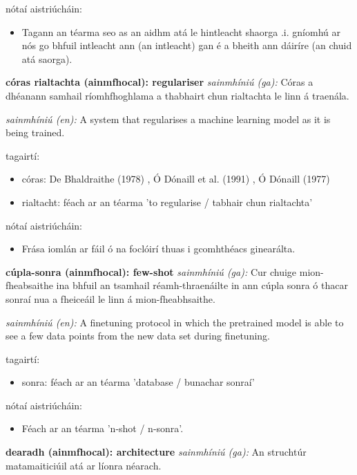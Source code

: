 \documentclass{article}
\begin{document}
nótaí aistriúcháin:
\begin{itemize}
	\item Tagann an téarma seo as an aidhm atá le hintleacht shaorga .i. gníomhú ar nós go bhfuil intleacht ann (an intleacht) gan é a bheith ann dáiríre (an chuid atá saorga).
\end{itemize}


\textbf{córas rialtachta (ainmfhocal): regulariser}
\textit{sainmhíniú (ga):} Córas a dhéanann samhail ríomhfhoghlama a thabhairt chun rialtachta le linn á traenála.

\textit{sainmhíniú (en):} A system that regularises a machine learning model as it is being trained.

tagairtí:
\begin{itemize}
	\item córas: De Bhaldraithe (1978) \cite{de-bhaldraithe}, Ó Dónaill et al. (1991) \cite{focloir-beag}, Ó Dónaill (1977) \cite{odonaill}
	\item rialtacht: féach ar an téarma 'to regularise / tabhair chun rialtachta'
\end{itemize}

nótaí aistriúcháin:
\begin{itemize}
	\item Frása iomlán ar fáil ó na foclóirí thuas i gcomhthéacs ginearálta.
\end{itemize}


\textbf{cúpla-sonra (ainmfhocal): few-shot}
\textit{sainmhíniú (ga):} Cur chuige mion-fheabsaithe ina bhfuil an tsamhail réamh-thraenáilte in ann cúpla sonra ó thacar sonraí nua a fheiceáil le linn á mion-fheabhsaithe.

\textit{sainmhíniú (en):} A finetuning protocol in which the pretrained model is able to see a few data points from the new data set during finetuning.

tagairtí:
\begin{itemize}
	\item sonra: féach ar an téarma 'database / bunachar sonraí'
\end{itemize}

nótaí aistriúcháin:
\begin{itemize}
	\item Féach ar an téarma 'n-shot / n-sonra'.
\end{itemize}


\textbf{dearadh (ainmfhocal): architecture}
\textit{sainmhíniú (ga):} An struchtúr matamaiticiúil atá ar líonra néarach.
\end{document}
